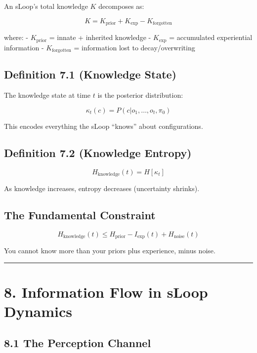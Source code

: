 \documentclass[
  11pt,
  letterpaper,
  twoside,
  openany]{book}
\makeatletter
\let\orig@section\section
\renewcommand{\section}{\needspace{8\baselineskip}\orig@section}
\let\orig@subsection\subsection
\renewcommand{\subsection}{\needspace{6\baselineskip}\orig@subsection}
\makeatother
\begin{document}
An sLoop's total knowledge \(K\) decomposes as:

\[K = K_{\text{prior}} + K_{\text{exp}} - K_{\text{forgotten}}\]

where: - \(K_{\text{prior}}\) = innate + inherited knowledge -
\(K_{\text{exp}}\) = accumulated experiential information -
\(K_{\text{forgotten}}\) = information lost to decay/overwriting

\subsection{Definition 7.1 (Knowledge
State)}\label{definition-7.1-knowledge-state}

The knowledge state at time \(t\) is the posterior distribution:

\[\kappa_t(c) = P(c | o_1, \ldots, o_t, \pi_0)\]

This encodes everything the sLoop ``knows'' about configurations.

\subsection{Definition 7.2 (Knowledge
Entropy)}\label{definition-7.2-knowledge-entropy}

\[H_{\text{knowledge}}(t) = H[\kappa_t]\]

As knowledge increases, entropy decreases (uncertainty shrinks).

\subsection{The Fundamental
Constraint}\label{the-fundamental-constraint}

\[H_{\text{knowledge}}(t) \leq H_{\text{prior}} - I_{\text{exp}}(t) + H_{\text{noise}}(t)\]

You cannot know more than your priors plus experience, minus noise.

\begin{center}\rule{0.5\linewidth}{0.5pt}\end{center}

\section{8. Information Flow in sLoop
Dynamics}\label{information-flow-in-sloop-dynamics}

\subsection{8.1 The Perception Channel}\label{the-perception-channel}
\end{document}

